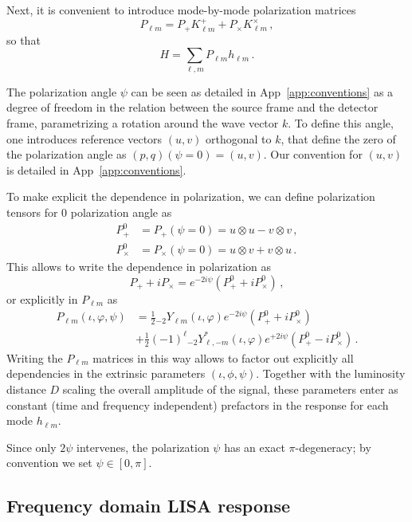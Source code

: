 \documentclass[aps,showpacs,twocolumn,prd,superscriptaddress,nofootinbib]{revtex4-1}
\newcommand{\be}{\begin{equation}}
\newcommand{\ee}{\end{equation}}
\newcommand{\bsub}{\begin{subequations}}
\newcommand{\esub}{\end{subequations}}
\newcommand{\nn}{\nonumber}
\newcommand{\sYlm}{{}_{-2}Y_{\ell m}}
\newcommand{\sYlminusmstar}{{}_{-2}Y_{\ell, -m}^{*}}
\begin{document}
Next, it is convenient to introduce mode-by-mode polarization matrices
\be
	P_{\ell m} = P_{+} K_{\ell m}^{+} + P_{\times} K_{\ell m}^{\times} \,,
\ee
so that
\be\label{eq:Hsummodes}
	H = \sum_{\ell, m} P_{\ell m} h_{\ell m} \,.
\ee

The polarization angle $\psi$ can be seen as detailed in App~\ref{app:conventions} as a degree of freedom in the relation between the source frame and the detector frame, parametrizing a rotation around the wave vector $k$. To define this angle, one introduces reference vectors $(u,v)$ orthogonal to $k$, that define the zero of the polarization angle as $(p,q)(\psi=0) = (u,v)$. Our convention for $(u,v)$ is detailed in App~\ref{app:conventions}.

To make explicit the dependence in polarization, we can define polarization tensors for 0 polarization angle as
\bsub
\begin{align}
	P_{+}^{0} &= P_{+}(\psi = 0) = u \otimes u - v \otimes v \,,\\
	P_{\times}^{0} &= P_{\times}(\psi = 0) = u \otimes v + v \otimes u \,.
\end{align}
\esub
This allows to write the dependence in polarization as
\be
	P_{+} + i P_{\times} = e^{-2 i \psi} \left( P_{+}^{0} + i P_{\times}^{0} \right) \,,
\ee
or explicitly in $P_{\ell m}$ as
\begin{align}
	P_{\ell m} (\iota, \varphi, \psi) &= \frac{1}{2} \sYlm(\iota, \varphi) e^{-2 i \psi} \left( P_{+}^{0} + i P_{\times}^{0} \right) \nn\\
	& + \frac{1}{2} (-1)^{\ell} \sYlminusmstar (\iota, \varphi) e^{+2 i \psi} \left( P_{+}^{0} - i P_{\times}^{0} \right) \,.
\end{align}
Writing the $P_{\ell m}$ matrices in this way allows to factor out explicitly all dependencies in the extrinsic parameters $(\iota, \phi, \psi)$. Together with the luminosity distance $D$ scaling the overall amplitude of the signal, these parameters enter as constant (time and frequency independent) prefactors in the response for each mode $h_{\ell m}$.

Since only $2\psi$ intervenes, the polarization $\psi$ has an exact $\pi$-degeneracy; by convention we set $\psi \in [0,\pi]$.


\subsection{Frequency domain LISA response}
\label{subsec:FDresponse}
\end{document}
